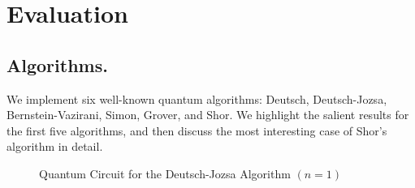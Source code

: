 \documentclass[sigplan]{acmart}
\begin{document}
\section{Evaluation}

\subsection*{Algorithms.} 

We implement six well-known
quantum algorithms: Deutsch, Deutsch-Jozsa, Bernstein-Vazirani,
Simon, Grover, and Shor. We highlight the salient results for the
first five algorithms, and then discuss the most interesting case of
Shor's algorithm in detail.

\begin{figure}[ht]
  \centering
{}
\caption{\label{fig:deutsch}Quantum Circuit for the Deutsch-Jozsa
  Algorithm $(n=1)$}
\end{figure}
\end{document}
